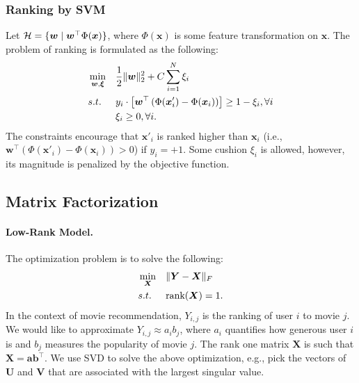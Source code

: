     \subsubsection{Ranking by SVM}
        Let $\mathcal{H}=\{ \bm{w} \mid \bm{w}^\top \Phi(\bm{x}) \}$, where $\Phi(\bm{x})$ is some feature transformation on $\bm{x}$.
        The problem of ranking is formulated as the following:
            \begin{equation}
                \begin{aligned}
                    & \min_{\bm{w}, \bm{\xi}} & & \frac{1}{2}\lVert\bm{w}\rVert_2^2 + C \sum_{i=1}^{N}{\xi_i} \\
                    & s.t. & & y_i \cdot \left[ \bm{w}^\top \left( \Phi(\bm{x}'_i) - \Phi(\bm{x}_i) \right) \right] \ge 1 - \xi_i, \forall i \\
                    & & & \xi_i \ge 0, \forall i.
                \end{aligned}
            \end{equation}
        The constraints encourage that $\bm{x}'_i$ is ranked higher than $\bm{x}_i$ (i.e., $\bm{w}^\top \left( \Phi(\bm{x}'_i) - \Phi(\bm{x}_i) \right) > 0$) if $y_i=+1$.
        Some cushion $\xi_i$ is allowed, however, its magnitude is penalized by the objective function.


\subsection{Matrix Factorization}
        \paragraph{Low-Rank Model.} 
        The optimization problem is to solve the following:
            \begin{equation}
                \begin{aligned}
                            & \min_{\bm{X}}  & & \lVert\bm{Y} - \bm{X}\rVert_F \\
                            & s.t. & & \text{rank}(\bm{X}) = 1.
                \end{aligned}
            \end{equation}
        In the context of movie recommendation, $Y_{i,j}$ is the ranking of user $i$ to movie $j$.
        We would like to approximate $Y_{i,j} \approx a_i b_j$, where $a_i$ quantifies how generous user $i$ is and $b_j$ measures the  popularity of movie $j$.
        The rank one matrix $\bm{X}$ is such that $\bm{X}=\bm{a}\bm{b}^\top$.
        We use SVD to solve the above optimization, e.g., pick the vectors of $\bm{U}$ and $\bm{V}$ that are associated with the largest singular value.

